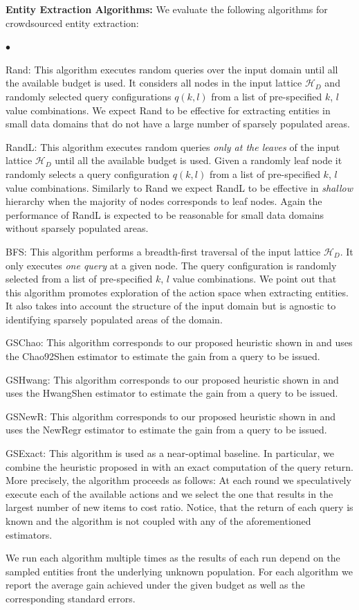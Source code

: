 \documentclass{vldb}
\newcommand{\squishlist}{
   \begin{list}{$\bullet$}
    {
      \setlength{\itemsep}{0pt}
      \setlength{\parsep}{3pt}
      \setlength{\topsep}{3pt}
      \setlength{\partopsep}{0pt}
      \setlength{\leftmargin}{1.5em}
      \setlength{\labelwidth}{1em}
      \setlength{\labelsep}{0.5em} } }
\newcommand{\squishend}{
    \end{list}  }
\newcommand{\hierarchy}{\mathcal{H}_D}
\begin{document}
\vspace{5pt}\noindent\textbf{Entity Extraction Algorithms:} We evaluate the following algorithms for crowdsourced entity extraction:
\squishlist
\item Rand: This algorithm executes random queries over the input domain until all the available budget is used. It considers all nodes in the input lattice $\hierarchy$ and randomly selected query configurations $q(k,l)$ from a list of pre-specified $k$, $l$ value combinations. We expect Rand to be effective for extracting entities in small data domains that do not have a large number of sparsely populated areas. 
\item RandL: This algorithm executes random queries {\em only at the leaves} of the input lattice $\hierarchy$ until all the available budget is used. Given a randomly leaf node it randomly selects a query configuration $q(k,l)$ from a list of pre-specified $k$, $l$ value combinations.  Similarly to Rand we expect RandL to be effective in {\em shallow} hierarchy when the majority of nodes corresponds to leaf nodes. Again the performance of RandL is expected to be reasonable for small data domains without sparsely populated areas. 
\item BFS: This algorithm performs a breadth-first traversal of the input lattice $\hierarchy$. It only executes {\em one query} at a given node. The query configuration is randomly selected from a list of pre-specified $k$, $l$ value combinations. We point out that this algorithm promotes exploration of the action space when extracting entities. It also takes into account the structure of the input domain but is agnostic to identifying sparsely populated areas of the domain.
\item GSChao: This algorithm corresponds to our proposed heuristic shown in  and uses the Chao92Shen estimator to estimate the gain from a query to be issued.
\item GSHwang: This algorithm corresponds to our proposed heuristic shown in  and uses the HwangShen estimator to estimate the gain from a query to be issued.
\item GSNewR: This algorithm corresponds to our proposed heuristic shown in  and uses the NewRegr estimator to estimate the gain from a query to be issued.
\item GSExact: This algorithm is used as a near-optimal baseline. In particular, we combine the heuristic proposed in  with an exact computation of the query return. More precisely, the algorithm proceeds as follows: At each round we speculatively execute each of the available actions and we select the one that results in the largest  number of new items to cost ratio. Notice, that the return of each query is known and the algorithm is not coupled with any of the aforementioned estimators.
\squishend
We run each algorithm multiple times as the results of each run depend on the sampled entities front the underlying unknown population. For each algorithm we report the average gain achieved under the given budget as well as the corresponding standard errors.
\end{document}
